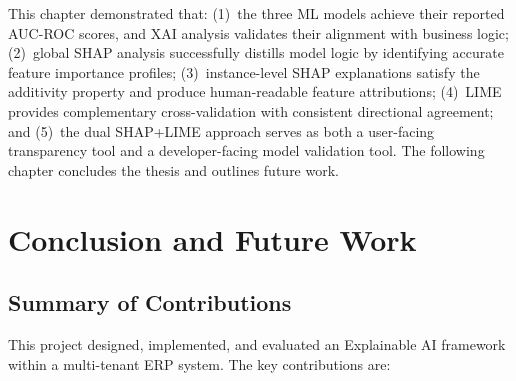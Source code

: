 \documentclass[12pt,a4paper]{report}
\begin{document}
This chapter demonstrated that: (1)~the three ML models achieve their reported AUC-ROC scores, and XAI analysis validates their alignment with business logic; (2)~global SHAP analysis successfully distills model logic by identifying accurate feature importance profiles; (3)~instance-level SHAP explanations satisfy the additivity property and produce human-readable feature attributions; (4)~LIME provides complementary cross-validation with consistent directional agreement; and (5)~the dual SHAP+LIME approach serves as both a user-facing transparency tool and a developer-facing model validation tool. The following chapter concludes the thesis and outlines future work.


%
%
\chapter{Conclusion and Future Work}
\label{ch:conclusion}

\section{Summary of Contributions}
\label{sec:contributions}

This project designed, implemented, and evaluated an Explainable AI framework within a multi-tenant ERP system. The key contributions are:
\end{document}
